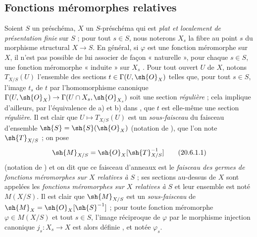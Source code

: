 \subsection{Fonctions méromorphes relatives}

\begin{env}[20.6.1]
Soient $S$ un préschéma, $X$ un $S$-préschéma qui est \emph{plat et localement de présentation finie} sur $S$ ; pour tout $s\in S$, nous noterons $X_s$ la fibre au point $s$ du morphisme structural $X\to S$.
En général, si $\varphi$ est une fonction méromorphe sur $X$, il n'est pas possible de lui associer de façon « naturelle », pour chaque $s\in S$, une fonction méromorphe « induite » sur $X_s$ .
Pour tout ouvert $U$ de $X$, notons $T_{X/S}(U)$ l'ensemble des sections $t\in\Gamma(U,\sh{O}_X)$ telles que, pour tout $s\in S$, l'image $t_s$ de $t$ par l'homomorphisme canonique $\Gamma(U,\sh{O}_X)\to\Gamma(U\cap X_s,\sh{O}_{X_s})$ soit une section \emph{régulière} ; cela implique d'ailleurs, par l'équivalence de a) et b) dans , que $t$ est elle-même une section \emph{régulière}.
Il est clair que $U\mapsto T_{X/S}(U)$ est un \emph{sous-faisceau} du faisceau d'ensemble $\sh{S}=\sh{S}(\sh{O}_X)$ (notation de ), que l'on note $\sh{T}_{X/S}$ ; on pose
\[
\label{IV.20.6.1.1}
  \sh{M}_{X/S}=\sh{O}_X[\sh{T}_{X/S}^{-1}]
  \tag{20.6.1.1}
\]
(notation de ) et on dit que ce faisceau d'anneaux est le \emph{faisceau des germes de fonctions méromorphes sur $X$ relatives à $S$} ; ses sections au-dessus de $X$ sont appelées les \emph{fonctions méromorphes sur $X$ relatives à $S$} et leur ensemble est noté $M(X/S)$.
Il est clair que $\sh{M}_{X/S}$ est un \emph{sous-faisceau} de $\sh{M}_X=\sh{O}_X[\sh{S}^{-1}]$ ; pour toute fonction méromorphe $\varphi\in M(X/S)$ et tout $s\in S$, l'image réciproque de $\varphi$ par le morphisme injection canonique $j_s:X_s\to X$ est alors définie , et notée $\varphi_s$.
\end{env}

